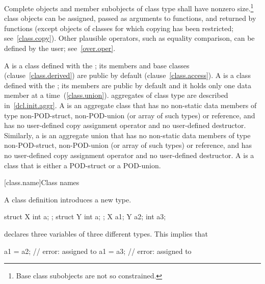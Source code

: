 \pnum
{}%
Complete objects and member subobjects of class type shall have nonzero
size.\footnote{Base class subobjects are not so constrained.}
%
\enternote
class objects can be assigned, passed as arguments to functions, and
returned by functions (except objects of classes for which copying has
been restricted; see~\ref{class.copy}). Other plausible operators, such
as equality comparison, can be defined by the user; see~\ref{over.oper}.
\exitnote

\pnum
{}%
%
%
A  is a class defined with the 
; its members and base classes (clause~\ref{class.derived})
are public by default (clause~\ref{class.access}).
A  is a class defined with the 
; its members are public by default and
%
it holds only one data member at a time~(\ref{class.union}).
\enternote
aggregates of class type are described in~\ref{dcl.init.aggr}.
\exitnote
A  is an aggregate class that has no non-static data
members of type non-POD-struct, non-POD-union (or array of such types)
or reference, and has no user-defined copy assignment operator and no
user-defined destructor. Similarly, a  is an aggregate
union that has no non-static data members of type non-POD-struct,
non-POD-union (or array of such types) or reference, and has no
user-defined copy assignment operator and no user-defined destructor.
A  is a class that is either a POD-struct or a POD-union.

[class.name]{Class names}
%
%
%

\pnum
A class definition introduces a new type.
\enterexample

\begin{codeblock}
struct X { int a; };
struct Y { int a; };
X a1;
Y a2;
int a3;
\end{codeblock}

declares three variables of three different types. This implies that

\begin{codeblock}
a1 = a2;                        // error:  assigned to 
a1 = a3;                        // error:  assigned to 
\end{codeblock}

